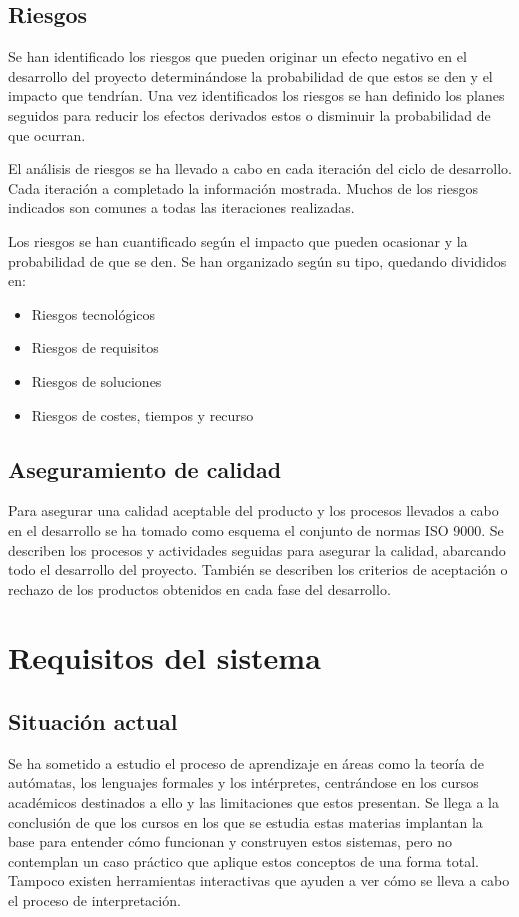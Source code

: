 \subsection{Riesgos}
Se han identificado los riesgos que pueden originar un efecto negativo en el 
desarrollo del proyecto determinándose la probabilidad de que estos se den y el impacto que tendrían. 
Una vez identificados los riesgos se han definido los planes seguidos para reducir los efectos derivados estos o disminuir
la probabilidad de que ocurran.

El análisis de riesgos se ha llevado a cabo en cada iteración del ciclo de desarrollo. Cada iteración a completado la 
información mostrada. Muchos de los riesgos indicados son comunes a todas las iteraciones realizadas.

Los riesgos se han cuantificado según el impacto que pueden ocasionar y la probabilidad de que se den. Se han organizado según su tipo, quedando divididos 
en: 

\begin{itemize} 
\item Riesgos tecnológicos
\item Riesgos de requisitos
\item Riesgos de soluciones
\item Riesgos de costes, tiempos y recurso
\end{itemize}

\subsection{Aseguramiento de calidad}

Para asegurar una calidad aceptable del producto y los procesos llevados a cabo en el desarrollo se ha tomado como esquema el conjunto de normas ISO 9000. 
Se describen los procesos y actividades seguidas para asegurar la calidad, abarcando todo el desarrollo del proyecto. También se describen los criterios de aceptación
o rechazo de los productos obtenidos en cada fase del desarrollo.

 \section{Requisitos del sistema}
 \subsection{Situación actual}
 Se ha sometido a estudio el proceso de aprendizaje en áreas como la teoría de autómatas, los lenguajes formales y los intérpretes, centrándose en los cursos académicos 
destinados a ello y las limitaciones que estos presentan. Se llega a la conclusión de que los cursos en los que se estudia estas materias implantan la base para entender cómo funcionan y construyen 
estos sistemas, pero no contemplan un caso práctico que aplique estos conceptos de una forma total. Tampoco existen herramientas interactivas que ayuden a ver cómo se 
lleva a cabo el proceso de interpretación.

